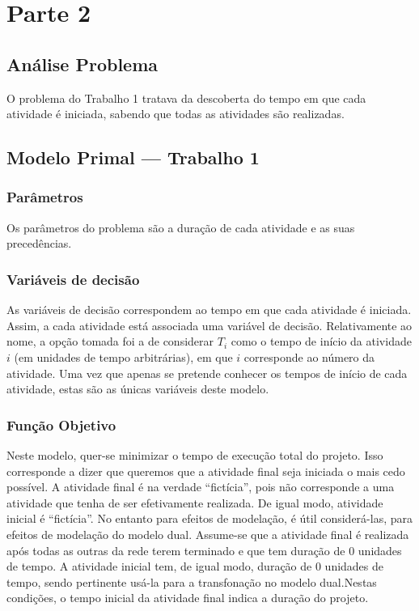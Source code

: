 \chapter{Parte 2}
\label{cap:p2}

\section{Análise Problema}

O problema do Trabalho 1 tratava da descoberta do tempo em que cada
atividade é iniciada, sabendo que todas as atividades são realizadas.



\section{Modelo Primal --- Trabalho 1}

\subsection{Parâmetros}

Os parâmetros do problema são a duração de cada atividade e as suas
precedências.

\subsection{Variáveis de decisão}

As variáveis de decisão correspondem ao tempo em que cada atividade é iniciada.
Assim, a cada atividade está associada uma variável de decisão. Relativamente ao
nome, a opção tomada foi a de considerar $T_{i}$ como o tempo de início da
atividade $i$ (em unidades de tempo arbitrárias), em que $i$ corresponde ao
número da atividade. Uma vez que apenas se pretende conhecer os tempos de início
de cada atividade, estas são as únicas variáveis deste modelo. 

\subsection{Função Objetivo}

Neste modelo, quer-se minimizar o tempo de execução total do projeto. Isso
corresponde a dizer que queremos que a atividade final seja iniciada o mais cedo
possível. A atividade final é na verdade ``fictícia'', pois não corresponde
a uma atividade que tenha de ser efetivamente realizada. De igual modo,
atividade inicial é  ``fictícia''. No entanto para efeitos de modelação, é útil
considerá-las, para efeitos de modelação do modelo dual. Assume-se que
a atividade final é realizada após todas as outras da rede terem terminado e que
tem duração de 0 unidades de tempo. A atividade inicial tem, de igual modo,
duração de 0 unidades de tempo, sendo pertinente usá-la para a transfonação no
modelo dual.Nestas condições, o tempo inicial da atividade final indica
a duração do projeto.


